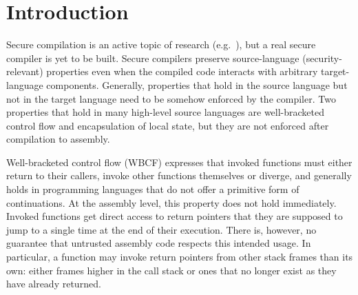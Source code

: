 \documentclass[acmsmall,screen]{acmart}\settopmatter{}
\begin{document}




\maketitle


\renewcommand\lau[1]{{\color{purple} \sf \footnotesize {LS: #1}}\\}
\renewcommand\dominique[1]{{\color{purple} \sf \footnotesize {DD: #1}}\\}
\renewcommand\lars[1]{{\color{purple} \sf \footnotesize {LB: #1}}\\}

\section{Introduction}
\label{sec:introduction}
Secure compilation is an active topic of research (e.g.~\citep{devriese_modular_2017,patrignani_hyper_2017,Abate:2018:GCG:3243734.3243745,new_universal_embedding_2016,juglaret_beyond_2016, patrignani_2019}), but a real secure compiler is yet to be built.
Secure compilers preserve source-language (security-relevant) properties even when the compiled code interacts with arbitrary target-language components.
Generally, properties that hold in the source language but not in the target language need to be somehow enforced by the compiler.
Two properties that hold in many high-level source languages are well-bracketed control flow and encapsulation of local state, but they are not enforced after compilation to assembly.

Well-bracketed control flow (WBCF) expresses that invoked functions must either return to their callers, invoke other functions themselves or diverge, and generally holds in programming languages that do not offer a primitive form of continuations. 
At the assembly level, this property does not hold immediately. 
Invoked functions get direct access to return pointers that they are supposed to jump to a single time at the end of their execution.
There is, however, no guarantee that untrusted assembly code respects this intended usage.
In particular, a function may invoke return pointers from other stack frames than its own: either frames higher in the call stack or ones that no longer exist as they have already returned. 
\end{document}
